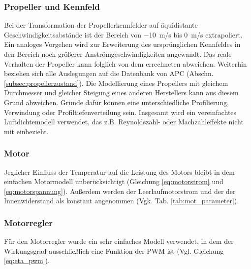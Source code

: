 \subsubsection{Propeller und Kennfeld}
Bei der Transformation der Propellerkennfelder auf äquidistante Geschwindigkeitsabstände ist der Bereich von \SI{-10}{m/s} bis \SI{0}{m/s} extrapoliert. Ein analoges Vorgehen wird zur Erweiterung des ursprünglichen Kennfeldes in den Bereich noch größerer Anströmgeschwindigkeiten angewandt. Das reale Verhalten der Propeller kann folglich von dem errechneten abweichen. Weiterhin beziehen sich alle Auslegungen auf die Datenbank von APC (Abschn. \ref{subsec:propellerzustand}). 
Die Modellierung eines Propellers mit gleichem Durchmesser und gleicher Steigung eines anderen Herstellers kann aus diesem Grund abweichen. Gründe dafür können eine unterschiedliche Profilierung, Verwindung oder Profiltiefenverteilung sein. Insgesamt wird ein vereinfachtes Luftdichtemodell verwendet, das z.B. Reynoldszahl- oder Machzahleffekte nicht mit einbezieht.

\subsubsection{Motor}
Jeglicher Einfluss der Temperatur auf die Leistung des Motors bleibt in dem einfachen Motormodell unberücksichtigt (Gleichung \ref{eq:motorstrom} und \ref{eq:motorspannung}). Außerdem werden der Leerlaufmotorstrom und der der Innenwiderstand als konstant angenommen (Vgk. Tab. \ref{tab:mot_parameter}).

\subsubsection{Motorregler}
Für den Motorregler wurde ein sehr einfaches Modell verwendet, in dem der Wirkungsgrad ausschließlich eine Funktion der PWM ist (Vgl. Gleichung \ref{eq:eta_pwm}).

